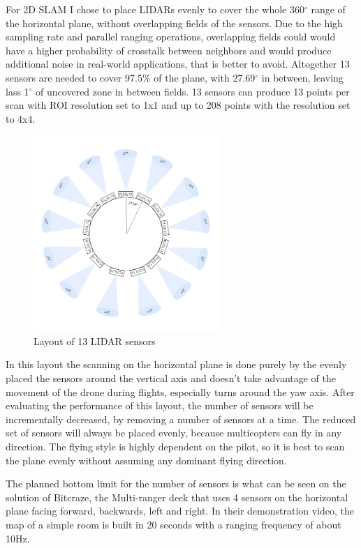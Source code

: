 For 2D SLAM I chose to place LIDARs evenly to cover the whole 360$^{\circ}$ range of the horizontal plane, 
without overlapping fields of the sensors. Due to the high sampling rate and parallel ranging operations, 
overlapping fields could would have a higher probability of crosstalk between neighbors and would produce 
additional noise in real-world applications, that is better to avoid. Altogether 13 sensors are needed to 
cover 97.5\% of the plane, with 27.69$^{\circ}$ in between, leaving lass 1$^{\circ}$ of uncovered zone in 
between fields. 13 sensors can produce 13 points per scan with ROI resolution set to 1x1 and up to 208 
points with the resolution set to 4x4. 

\begin{figure}[ht]
    \centering
    \includegraphics[width=70mm, keepaspectratio]{figures/2d_slam_13sensors.png}
    \caption{Layout of 13 LIDAR sensors}
    \label{fig:2d_13sensor_layout}
\end{figure}

In this layout the scanning on the horizontal plane is done purely by the evenly placed the sensors 
around the vertical axis and doesn't take advantage of the movement of the drone during flights, especially 
turns around the yaw axis. After evaluating the performance of this layout, the number of sensors will be
incrementally decreased, by removing a number of sensors at a time. The reduced set of sensors will always
be placed evenly, because multicopters can fly in any direction. The flying style is highly dependent on the
pilot, so it is best to scan the plane evenly without assuming any dominant flying direction.

The planned bottom limit for the number of sensors is what can be seen on the solution of Bitcraze, 
the Multi-ranger deck\cite{BitcrazeMultirangerDeck} that uses 4 sensors on the horizontal plane facing forward, 
backwards, left and right. In their demonstration video, the map of a simple room is built in 20 seconds 
with a ranging frequency of about 10Hz. 

